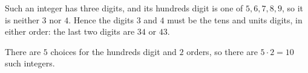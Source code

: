 Such an integer has three digits, and its hundreds digit is one of $5,6,7,8,9$, so it is neither $3$ nor $4$. Hence the digits $3$ and $4$ must be the tens and units digits, in either order: the last two digits are $34$ or $43$.

There are $5$ choices for the hundreds digit and $2$ orders, so there are $5\cdot2=\boxed{10}$ such integers.
